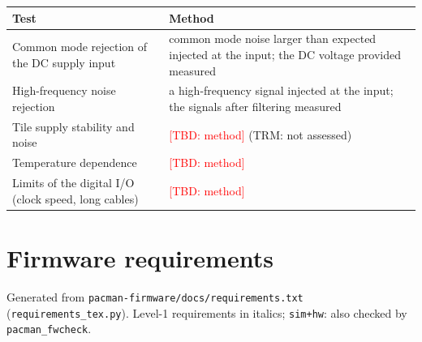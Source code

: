 \documentclass[11pt]{article}
\newcommand{\tbd}[1]{\textcolor{red}{[TBD: #1]}}
\begin{document}
\begin{center}
\begin{tabularx}{\linewidth}{@{}lL@{}}
\toprule
Test & Method \\
\midrule
Common mode rejection of the DC supply input & common mode noise larger than expected injected at the input;
  the DC voltage provided measured \\
High-frequency noise rejection & a high-frequency signal injected at the input;  the signals after filtering
  measured \\
Tile supply stability and noise & \tbd{method} (TRM:  not assessed) \\
Temperature dependence & \tbd{method} \\
Limits of the digital I/O (clock speed, long cables) & \tbd{method} \\
\bottomrule
\end{tabularx}
\end{center}

\appendix
\section{Firmware requirements}\label{app:requirements}

Generated from \texttt{pacman-firmware/docs/requirements.txt} (\texttt{requirements\_tex.py}).  Level-1
requirements in italics; \texttt{sim+hw}: also checked by \texttt{pacman\_fwcheck}.


\end{document}
